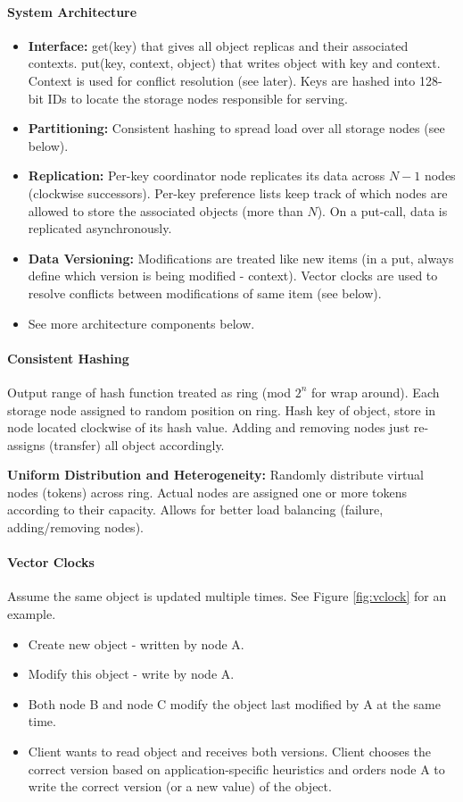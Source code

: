 \paragraph{System Architecture}
\begin{itemize}
    \item \textbf{Interface:} get(key) that gives  all object replicas and their associated contexts. put(key, context, object) that writes object with key and context. Context is used for conflict resolution (see later). Keys are hashed into 128-bit IDs to locate the storage nodes responsible for serving.
    \item \textbf{Partitioning:} Consistent hashing to spread load over all storage nodes (see below).
    \item \textbf{Replication:} Per-key coordinator node replicates its data across $N-1$ nodes (clockwise successors). Per-key preference lists keep track of which nodes are allowed to store the associated objects (more than $N$). On a put-call, data is replicated asynchronously.
    \item \textbf{Data Versioning:} Modifications are treated like new items (in a put, always define which version is being modified - context). Vector clocks are used to resolve conflicts between modifications of same item (see below).
    \item See more architecture components below.
\end{itemize}

\paragraph{Consistent Hashing}
Output range of hash function treated as ring (mod $2^n$ for wrap around). Each storage node assigned to random position on ring. Hash key of object, store in node located clockwise of its hash value. Adding and removing nodes just re-assigns (transfer) all object accordingly.

\textbf{Uniform Distribution and Heterogeneity:} Randomly distribute virtual nodes (tokens) across ring. Actual nodes are assigned one or more tokens according to their capacity. Allows for better load balancing (failure, adding/removing nodes).



\paragraph{Vector Clocks}
Assume the same object is updated multiple times. See Figure \ref{fig:vclock} for an example.
\begin{itemize}
    \item Create new object - written by node A.
    \item Modify this object - write by node A.
    \item Both node B and node C modify the object last modified by A at the same time.
    \item Client wants to read object and receives both versions. Client chooses the correct version based on application-specific heuristics and orders node A to write the correct version (or a new value) of the object.
\end{itemize}

